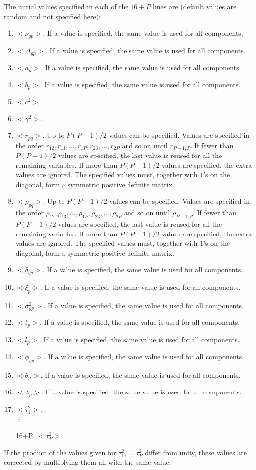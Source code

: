 \documentclass[11pt]{article}
\begin{document}
The initial values specified in each of the $16+P$ lines are (default values are random
and not specified here):
\begin{enumerate}
\item $<\nu_{gp}>$. If a value is specified, the same value is used for all components.
\item $<\Delta_{gp}>$. If a value is specified, the same value is used for all components.
\item $<a_p>$. If a value is specified, the same value is used for all components.
\item $<b_p>$. If a value is specified, the same value is used for all components.
\item $<c^2>$.
\item $<\gamma^2>$.
\item $<r_{pq}>$. Up to $P(P-1)/2$ values can be specified. Values are specified in the order
$r_{12},r_{13},\ldots,r_{1P},r_{23},\ldots,r_{2P}$ and so on until $r_{P-1,P}$. If fewer 
than $P(P-1)/2$ values are specified, the last value is reused for all the remaining variables.
If more than $P(P-1)/2$ values are specified, the extra values are ignored. The specified 
values must, together with $1$'s on the diagonal, form a symmetric positive definite matrix.
\item $<\rho_{pq}>$. Up to $P(P-1)/2$ values can be specified. Values are specified in the order
$\rho_{12},\rho_{13},\ldots,\rho_{1P},\rho_{23},\ldots,\rho_{2P}$ and so on until $\rho_{P-1,P}$. If fewer 
than $P(P-1)/2$ values are specified, the last value is reused for all the remaining variables.
If more than $P(P-1)/2$ values are specified, the extra values are ignored. The specified 
values must, together with $1$'s on the diagonal, form a symmetric positive definite matrix.
\item $<\delta_{gp}>$. If a value is specified, the same value is used for all components.
\item $<\xi_p >$. If a value is specified, the same value is used for all components.
\item $<\sigma^2_{gp}>$. If a value is specified, the same value is used for all components.
\item $<t_p>$. If a value is specified, the same value is used for all components.
\item $<l_p>$. If a value is specified, the same value is used for all components.
\item $<\phi_{gp}>$. If a value is specified, the same value is used for all components.
\item $<\theta_p>$. If a value is specified, the same value is used for all components.
\item $<\lambda_p>$. If a value is specified, the same value is used for all components.
\item $<\tau^2_1>$.\\
\vdots
\item[16+P.] $<\tau^2_P>$. 
\end{enumerate}
If the product of the values given for $\tau^2_1,\ldots,\tau^2_P$ differ from unity,
these values are corrected by multiplying them all with the same value.
\end{document}
